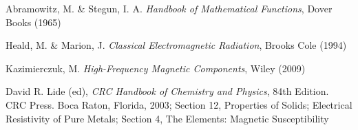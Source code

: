 \documentclass[10pt,a4paper]{article}
\begin{document}
\begin{thebibliography}{9}

Abramowitz, M. \& Stegun, I. A.
\emph{Handbook of Mathematical Functions},
Dover Books (1965)

Heald, M. \& Marion, J.
\emph{Classical Electromagnetic Radiation},
Brooks Cole (1994)

Kazimierczuk, M.
\emph{High-Frequency Magnetic Components},
Wiley (2009)

David R. Lide (ed),
\emph{CRC Handbook of Chemistry and Physics},
84th Edition. CRC Press. Boca Raton, Florida, 2003;
Section 12, Properties of Solids; Electrical Resistivity of Pure Metals;
Section 4, The Elements: Magnetic Susceptibility

\end{thebibliography}
\end{document}
